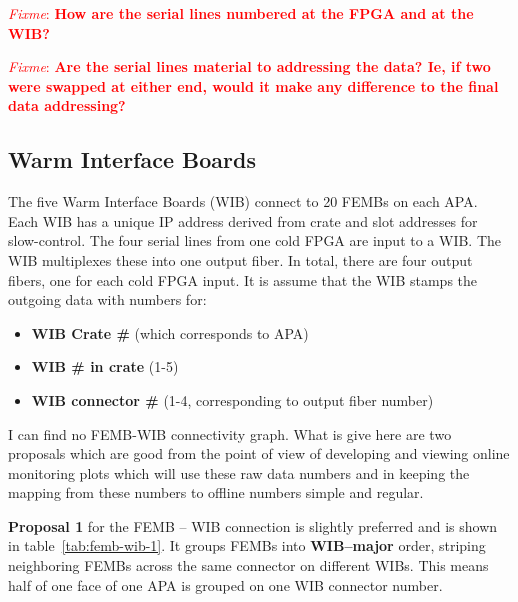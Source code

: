 \documentclass[pdftex,12pt,letter]{article}
\newcommand{\fixme}[1]{\textcolor{red}{\textit{Fixme}: \textbf{#1}}}
\begin{document}
\fixme{How are the serial lines numbered at the FPGA and at the WIB?}

\fixme{Are the serial lines material to addressing the data?  Ie, if two were swapped at either end, would it make any difference to the final data addressing?}


\subsection{Warm Interface Boards}


The five Warm Interface Boards (WIB) connect to 20 FEMBs on each APA.
Each WIB has a unique IP address derived from crate and slot addresses
for slow-control.  The four serial lines from one cold FPGA are input
to a WIB.  The WIB multiplexes these into one output fiber.  In total,
there are four output fibers, one for each cold FPGA input.  It is
assume that the WIB stamps the outgoing data with numbers for:

\begin{itemize}
\item \textbf{WIB Crate \#} (which corresponds to APA)
\item \textbf{WIB \# in crate} (1-5)
\item \textbf{WIB connector \#} (1-4, corresponding to output fiber number)
\end{itemize}

I can find no FEMB-WIB connectivity graph.  What is give here are two
proposals which are good from the point of view of developing and
viewing online monitoring plots which will use these raw data numbers
and in keeping the mapping from these numbers to offline numbers
simple and regular.  

\textbf{Proposal 1} for the FEMB -- WIB connection is slightly
preferred and is shown in table~\ref{tab:femb-wib-1}.  It groups FEMBs
into \textbf{WIB--major} order, striping neighboring FEMBs across the
same connector on different WIBs.  This means half of one face of one
APA is grouped on one WIB connector number.
\end{document}

